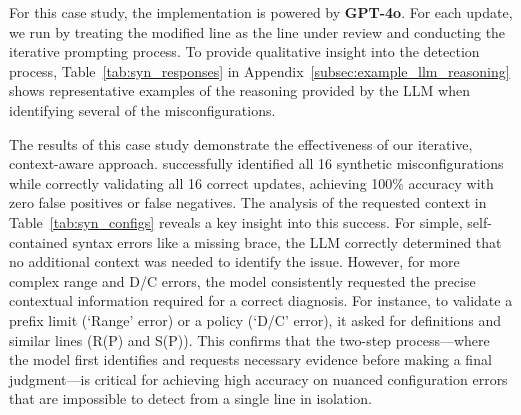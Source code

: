 For this case study, the \sysname{} implementation is powered by \textbf{GPT-4o}. For each update, we run \sysname{} by treating the modified line as the line under review and conducting the iterative prompting process. 
To provide qualitative insight into the detection process, Table~\ref{tab:syn_responses} in Appendix~\ref{subsec:example_llm_reasoning} shows representative examples of the reasoning provided by the LLM when identifying several of the misconfigurations.



The results of this case study demonstrate the effectiveness of our iterative, context-aware approach. \sysname{} successfully identified all 16 synthetic misconfigurations while correctly validating all 16 correct updates, achieving 100\% accuracy with zero false positives or false negatives.
The analysis of the requested context in Table~\ref{tab:syn_configs} reveals a key insight into this success. For simple, self-contained syntax errors like a missing brace, the LLM correctly determined that no additional context was needed to identify the issue. However, for more complex range and D/C errors, the model consistently requested the precise contextual information required for a correct diagnosis. For instance, to validate a prefix limit (`Range' error) or a policy (`D/C' error), it asked for definitions and similar lines (R(P) and S(P)). This confirms that the two-step process—where the model first identifies and requests necessary evidence before making a final judgment—is critical for achieving high accuracy on nuanced configuration errors that are impossible to detect from a single line in isolation.

